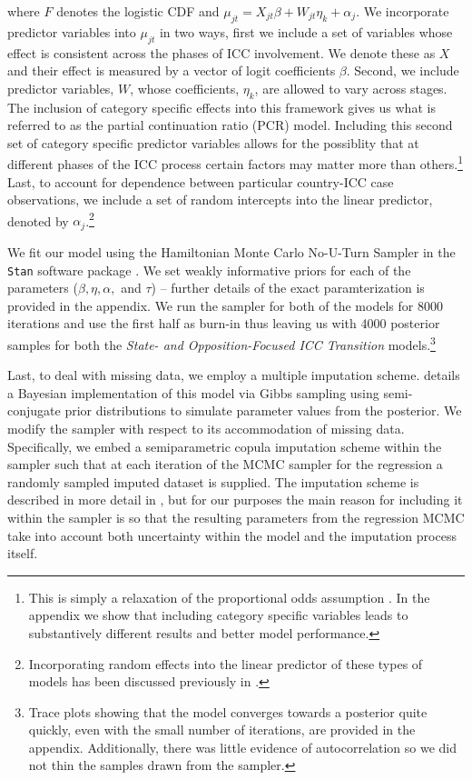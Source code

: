 where $F$ denotes the logistic CDF and $\mu_{jt} = X_{jt} \beta + W_{jt}\eta_{k} + \alpha_{j}$. We incorporate predictor variables into $\mu_{jt}$ in two ways, first we include a set of variables whose effect is consistent across the phases of ICC involvement. We denote these as $X$ and their effect is measured by a vector of logit coefficients $\beta$. Second, we include predictor variables, $W$, whose coefficients, $\eta_{k}$, are allowed to vary across stages. The inclusion of category specific effects into this framework gives us what is referred to as the partial continuation ratio (PCR) model. Including this second set of category specific predictor variables allows for the possiblity that at different phases of the ICC process certain factors may matter more than others.\footnote{This is simply a relaxation of the proportional odds assumption \citep{peterson1990partial}. In the appendix we show that including category specific variables leads to substantively different results and better model performance.} Last, to account for dependence between particular country-ICC case observations, we include a set of random intercepts into the linear predictor, denoted by $\alpha_{j}$.\footnote{Incorporating random effects into the linear predictor of these types of models has been discussed previously in \citet{have:uttal:1994, tutz:hennevogl:1996, dos2000continuation, hartzel2001multinomial}.}

We fit our model using the Hamiltonian Monte Carlo No-U-Turn Sampler in the \texttt{Stan} software package \citep{carpenter2017stan}. We set weakly informative priors for each of the parameters ($\beta, \eta, \alpha,$  and $\tau$) -- further details of the exact paramterization is provided in the appendix. We run the sampler for both of the models for 8000 iterations and use the first half as burn-in thus leaving us with 4000 posterior samples for both the \emph{State- and Opposition-Focused ICC Transition} models.\footnote{Trace plots showing that the model converges towards a posterior quite quickly, even with the small number of iterations, are provided in the appendix. Additionally, there was little evidence of autocorrelation so we did not thin the samples drawn from the sampler.}

Last, to deal with missing data, we employ a multiple imputation scheme. \citep{hoff:2007} details a Bayesian implementation of this model via Gibbs sampling using semi-conjugate prior distributions to simulate parameter values from the posterior. We modify the sampler with respect to its accommodation of missing data. Specifically, we embed a semiparametric copula imputation scheme within the sampler such that at each iteration of the MCMC sampler for the regression a randomly sampled imputed dataset is supplied. The imputation scheme is described in more detail in \citep{hollenbach:etal:2018}, but for our purposes the main reason for including it within the sampler is so that the resulting parameters from the regression MCMC take into account both uncertainty within the model and the imputation process itself.

